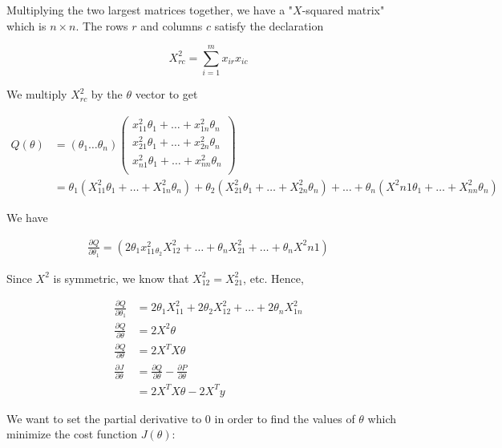 \noindent Multiplying the two largest matrices together, we have a "$X$-squared matrix" which is
$n\times n$. The rows $r$ and columns $c$ satisfy the declaration

\begin{equation*}
    X^2_{rc} = \sum^m_{i=1} x_{ir}x_{ic}
\end{equation*}

\noindent We multiply $X^2_{rc}$ by the $\theta$ vector to get

\begin{align*}
    Q(\theta) &= (\theta_1\dots\theta_n)
    \begin{pmatrix}
        x^2_{11}\theta_1 + \dots + x^2_{1n}\theta_n \\
        x^2_{21}\theta_1 + \dots + x^2_{2n}\theta_n \\
        x^2_{n1}\theta_1 + \dots + x^2_{nn}\theta_n \\
    \end{pmatrix} \\
    &= \theta_1(X^2_{11}\theta_1+\dots+X^2_{1n}\theta_n) + \theta_2(X^2_{21}\theta_1+\dots+X^2_{2n}\theta_n)
    +\dots+\theta_n(X^2{n1}\theta_1+\dots+X^2_{nn}\theta_n)
\end{align*}

\noindent We have

\begin{align*}
    \frac{\partial Q}{\partial \theta_1} = (2\theta_1 x^2_{11}_\theta_2 X^2_{12}+\dots+
    \theta_n X^2_{21}+\dots+\theta_n X^2{n1})
\end{align*}

\noindent Since $X^2$ is symmetric, we know that $X^2_{12} = X^2_{21}$, etc. Hence,

\begin{align*}
    \frac{\partial Q}{\partial \theta_1} &= 2\theta_1 X^2_{11}+2\theta_2 X^2_{12}+\dots+2\theta_n X^2_{1n} \\
    \frac{\partial Q}{\partial \theta} &= 2X^2\theta \\
    \frac{\partial Q}{\partial \theta} &= 2X^T X\theta \\
    \frac{\partial J}{\partial \theta} &= \frac{\partial Q}{\partial\theta}-\frac{\partial P}{\partial\theta} \\
    &= 2X^T X\theta - 2X^T y
\end{align*}

\noindent We want to set the partial derivative to 0 in order to find the values of $\theta$ which
minimize the cost function $J(\theta)$:

